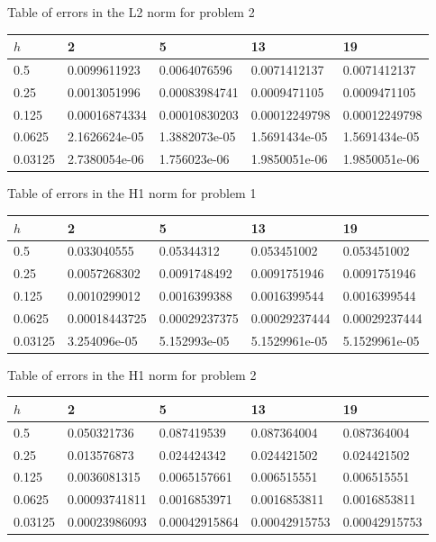 \documentclass[
  11pt,
]{article}
\begin{document}
Table of errors in the L2 norm for problem 2

\begin{longtable}[]{@{}lllll@{}}
\toprule
\(h\) & 2 & 5 & 13 & 19 \\
\midrule
\endhead
0.5 & 0.0099611923 & 0.0064076596 & 0.0071412137 & 0.0071412137 \\
0.25 & 0.0013051996 & 0.00083984741 & 0.0009471105 & 0.0009471105 \\
0.125 & 0.00016874334 & 0.00010830203 & 0.00012249798 & 0.00012249798 \\
0.0625 & 2.1626624e-05 & 1.3882073e-05 & 1.5691434e-05 &
1.5691434e-05 \\
0.03125 & 2.7380054e-06 & 1.756023e-06 & 1.9850051e-06 &
1.9850051e-06 \\
\bottomrule
\end{longtable}

Table of errors in the H1 norm for problem 1

\begin{longtable}[]{@{}lllll@{}}
\toprule
\(h\) & 2 & 5 & 13 & 19 \\
\midrule
\endhead
0.5 & 0.033040555 & 0.05344312 & 0.053451002 & 0.053451002 \\
0.25 & 0.0057268302 & 0.0091748492 & 0.0091751946 & 0.0091751946 \\
0.125 & 0.0010299012 & 0.0016399388 & 0.0016399544 & 0.0016399544 \\
0.0625 & 0.00018443725 & 0.00029237375 & 0.00029237444 &
0.00029237444 \\
0.03125 & 3.254096e-05 & 5.152993e-05 & 5.1529961e-05 & 5.1529961e-05 \\
\bottomrule
\end{longtable}

Table of errors in the H1 norm for problem 2

\begin{longtable}[]{@{}lllll@{}}
\toprule
\(h\) & 2 & 5 & 13 & 19 \\
\midrule
\endhead
0.5 & 0.050321736 & 0.087419539 & 0.087364004 & 0.087364004 \\
0.25 & 0.013576873 & 0.024424342 & 0.024421502 & 0.024421502 \\
0.125 & 0.0036081315 & 0.0065157661 & 0.006515551 & 0.006515551 \\
0.0625 & 0.00093741811 & 0.0016853971 & 0.0016853811 & 0.0016853811 \\
0.03125 & 0.00023986093 & 0.00042915864 & 0.00042915753 &
0.00042915753 \\
\bottomrule
\end{longtable}
\end{document}
